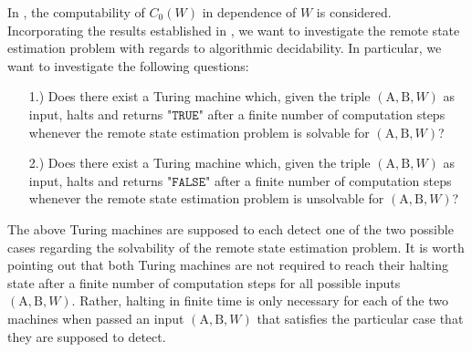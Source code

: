 \documentclass[conference]{IEEEtran}
\def\mA{\bm{\mathrm{A}}}
\def\mB{\bm{\mathrm{B}}}
\begin{document}
	In \cite{BD20Z}, the computability of \(C_0(W)\) in dependence of \(W\) is considered. Incorporating the results established in \cite{BD20Z}, 
	we want to investigate the remote state estimation problem with regards to algorithmic decidability. In particular, we want to investigate the following questions:
	\begin{itemize}	\item[1.)] Does there exist a Turing machine which, given the triple \((\mA,\mB,W)\) as input, halts and returns "\(\mathtt{TRUE}\)" after
						a finite number of computation steps whenever the remote state estimation problem is solvable for \((\mA,\mB,W)\)?
					\item[2.)] Does there exist a Turing machine which, given the triple \((\mA,\mB,W)\) as input, halts and returns "\(\mathtt{FALSE}\)" after
						a finite number of computation steps whenever the remote state estimation problem is unsolvable for \((\mA,\mB,W)\)?
	\end{itemize}
	The above Turing machines are supposed to each detect one of the two possible cases regarding the solvability of the remote state estimation problem. 
	It is worth pointing out that both Turing machines are not required to reach their halting state after a finite number of computation steps for all possible 
	inputs \((\mA,\mB,W)\). Rather, halting in finite time is only necessary for each of the two machines when passed an input \((\mA,\mB,W)\) that satisfies the 
	particular case that they are supposed to detect.
\end{document}
